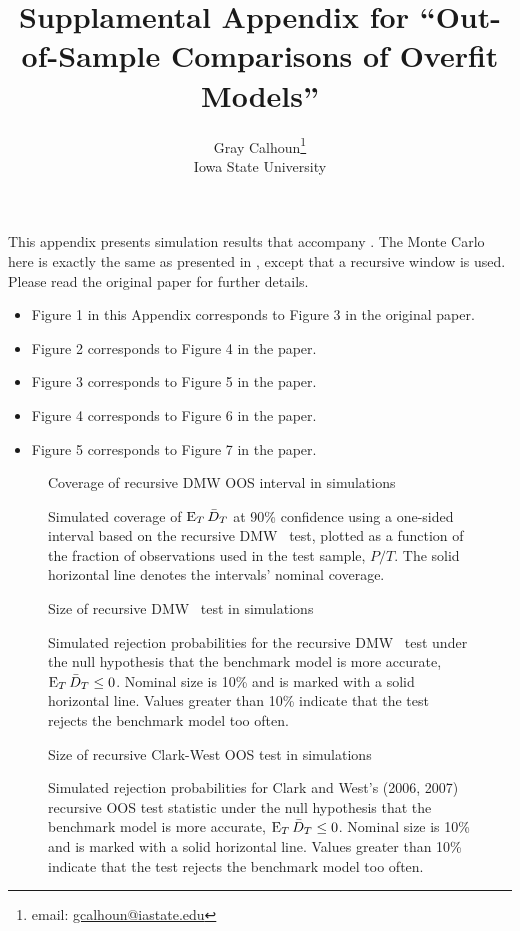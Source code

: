 \documentclass[12pt]{article}
\title{Supplamental Appendix for ``Out-of-Sample Comparisons of
  Overfit Models''}
\author{Gray Calhoun\thanks{email: \protect\url{gcalhoun@iastate.edu}} \\
  Iowa State University}
\begin{document}
\maketitle

This appendix presents simulation results that accompany
\citet{Cal:14}. The Monte Carlo here is exactly the same as presented
in \citet{Cal:14}, except that a recursive window is used. Please read
the original paper for further details.

\begin{itemize}

\item Figure 1 in this Appendix corresponds to Figure 3 in the
  original paper.
\item Figure 2 corresponds to Figure 4 in the paper.
\item Figure 3 corresponds to Figure 5 in the paper.
\item Figure 4 corresponds to Figure 6 in the paper.
\item Figure 5 corresponds to Figure 7 in the paper.

\end{itemize}

\nocite{DiM:95,Wes:96,Mcc:07,ClW:06,ClW:07}



\begin{figure}\centering
  {\large Coverage of recursive DMW OOS interval in simulations}
  
  \caption{Simulated coverage of $\operatorname{E}_T \bar{D}_{T}$ at 90\% confidence using
    a one-sided interval based on the recursive DMW \oost\ test,
    plotted as a function of the fraction of observations used in the
    test sample, $P/T$.  The solid horizontal line denotes the
    intervals' nominal coverage.}
  \label{fig:interval-T}
\end{figure}

\begin{figure}\centering
  {\large Size of recursive DMW \oost\ test in simulations}
  
  \caption{Simulated rejection probabilities for the recursive DMW
    \oost\ test under the null hypothesis that the benchmark model is
    more accurate, $\operatorname{E}_T \bar{D}_{T} \leq 0$. Nominal size is 10\% and is
    marked with a solid horizontal line. Values greater than 10\%
    indicate that the test rejects the benchmark model too often.}
  \label{fig:ttest-size}
\end{figure}

\begin{figure}\centering
  {\large Size of recursive Clark-West OOS test in simulations}
  
  \caption{Simulated rejection probabilities for Clark and West's
    (2006, 2007) recursive OOS test statistic under the null
    hypothesis that the benchmark model is more accurate, $\operatorname{E}_T \bar{D}_{T}
    \leq 0$. Nominal size is 10\% and is marked with a solid
    horizontal line. Values greater than 10\% indicate that the test
    rejects the benchmark model too often.}
  \label{fig:clarkwest}
\end{figure}
\end{document}
